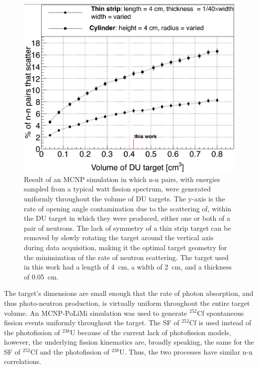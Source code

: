 \begin{figure}
    \centering
    \includegraphics[width = \figsize\textwidth]{ElasticScatteringPlot.png}
    \caption{
     Result of an MCNP simulation in which n-n pairs, with energies sampled from a typical watt fission spectrum, were generated uniformly throughout the volume of DU targets.
        The y-axis is the rate of opening angle contamination due to the scattering of, within the DU target in which they were produced, either one or both of a pair of neutrons.
    The lack of symmetry of a thin strip target can be removed by slowly rotating the target around the vertical axis during data acquisition, making it the optimal target geometry for the minimization of the rate of neutron scattering.
    The target used in this work had a length of 4~cm, a width of 2~cm, and a thickness of 0.05~cm.
    }
    \label{fig:ElasticScatteringPlot}
\end{figure}

The target's dimensions are small enough that the rate of photon absorption, and thus photo-neutron production, is virtually uniform throughout the entire target volume.
An MCNP-PoLiMi simulation was used to generate $^{252}$Cf spontaneous fission events uniformly throughout the target.
The SF of $^{252}$Cf is used instead of the photofission of $^{238}$U because of the current lack of photofission models, however, the underlying fission kinematics are, broadly speaking, the same for the SF of $^{252}$Cf and the photofission of $^{238}$U.
Thus, the two processes have similar n-n correlations.

